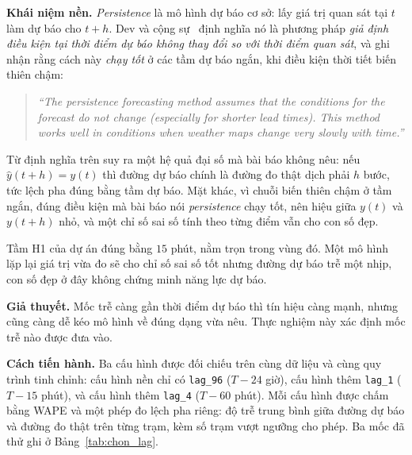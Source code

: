 \textbf{Khái niệm nền.} \textit{Persistence} là mô hình dự báo cơ sở: lấy giá trị quan sát
tại $t$ làm dự báo cho $t+h$. Dev và cộng sự~\cite{dev2018tes} định nghĩa nó là phương pháp
\textit{giả định điều kiện tại thời điểm dự báo không thay đổi so với thời điểm quan sát},
và ghi nhận rằng cách này \textit{chạy tốt} ở các tầm dự báo ngắn, khi điều kiện thời tiết
biến thiên chậm:

\begin{quote}\small
\textit{``The persistence forecasting method assumes that the conditions for the forecast do not change (especially for shorter lead times). This method works well in conditions when weather maps change very slowly with time.''}
\end{quote}


Từ định nghĩa trên suy ra một hệ quả đại số mà bài báo không nêu: nếu $\hat{y}(t+h) = y(t)$
thì đường dự báo chính là đường đo thật dịch phải $h$ bước, tức lệch pha đúng bằng
tầm dự báo. Mặt khác, vì chuỗi biến thiên chậm ở tầm ngắn, đúng điều kiện mà bài báo nói
\textit{persistence} chạy tốt, nên hiệu giữa $y(t)$ và $y(t+h)$ nhỏ, và một chỉ số sai số
tính theo từng điểm vẫn cho con số đẹp.

Tầm H1 của dự án đúng bằng $15$ phút, nằm trọn trong vùng đó. Một mô hình lặp lại giá trị vừa
đo sẽ cho chỉ số sai số tốt nhưng đường dự báo trễ một nhịp, con số đẹp
ở đây không chứng minh năng lực dự báo.

\textbf{Giả thuyết.} Mốc trễ càng gần thời điểm dự báo thì tín hiệu càng mạnh, nhưng cũng
càng dễ kéo mô hình về đúng dạng vừa nêu. Thực nghiệm này xác định mốc trễ nào được đưa vào.

\textbf{Cách tiến hành.} Ba cấu hình được đối chiếu trên cùng dữ liệu và cùng quy trình tinh
chỉnh: cấu hình nền chỉ có \texttt{lag\_96} ($T - 24$ giờ), cấu hình thêm \texttt{lag\_1}
($T - 15$ phút), và cấu hình thêm \texttt{lag\_4} ($T - 60$ phút). Mỗi cấu hình được chấm
bằng WAPE và một phép đo lệch pha riêng: độ trễ trung bình giữa đường dự báo và
đường đo thật trên từng trạm, kèm số trạm vượt ngưỡng cho phép. Ba mốc đã thử ghi ở
Bảng~\ref{tab:chon_lag}.

